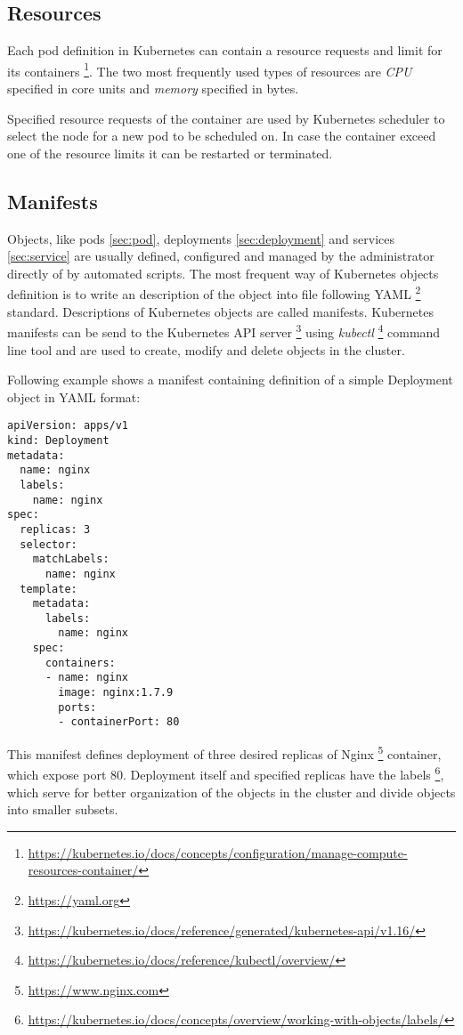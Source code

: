 \documentclass[
  digital, %
  twoside, %
  table,   %
  lof,     %
  lot,     %
]{fithesis3}
\begin{document}
\subsection{Resources} \label{sec:resources}
Each pod definition in Kubernetes can contain a resource requests and limit for its containers \footnote{\url{https://kubernetes.io/docs/concepts/configuration/manage-compute-resources-container/}}. The two most frequently used types of resources are \textit{CPU} specified in core units and \textit{memory} specified in bytes.

Specified resource requests of the container are used by Kubernetes scheduler to select the node for a new pod to be scheduled on. In case the container exceed one of the resource limits it can be restarted or terminated.

\subsection{Manifests} \label{sec:manifest}
Objects, like pods \ref{sec:pod}, deployments \ref{sec:deployment} and services \ref{sec:service} are usually defined, configured and managed by the administrator directly of by automated scripts. The most frequent way of Kubernetes objects definition is to write an description of the object into file following YAML \footnote{\url{https://yaml.org}} standard. Descriptions of Kubernetes objects are called manifests. Kubernetes manifests can be send to the Kubernetes API server \footnote{\url{https://kubernetes.io/docs/reference/generated/kubernetes-api/v1.16/}} using \textit{kubectl} \footnote{\url{https://kubernetes.io/docs/reference/kubectl/overview/}} command line tool and are used to create, modify and delete objects in the cluster.

Following example shows a manifest containing definition of a simple Deployment object in YAML format:
\begin{lstlisting}
apiVersion: apps/v1
kind: Deployment
metadata:
  name: nginx
  labels:
    name: nginx
spec:
  replicas: 3
  selector:
    matchLabels:
      name: nginx
  template:
    metadata:
      labels:
        name: nginx
    spec:
      containers:
      - name: nginx
        image: nginx:1.7.9
        ports:
        - containerPort: 80
\end{lstlisting}

This manifest defines deployment of three desired replicas of Nginx \footnote{\url{https://www.nginx.com}} container, which expose port 80. Deployment itself and specified replicas have the labels \footnote{\url{https://kubernetes.io/docs/concepts/overview/working-with-objects/labels/}}, which serve for better organization of the objects in the cluster and divide objects into smaller subsets.
\end{document}
